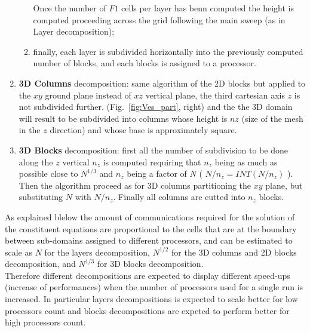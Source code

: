 \begin{enumerate}
\begin{enumerate}
Once the number of $F1$ cells per layer has benn computed the height is computed 
proceeding across the grid following the main sweep (as in Layer decomposition);
\item finally, each layer is subdivided horizontally into the previously computed number
of blocks, and each blocks is assigned to a processor. 
\end{enumerate}
\item {\bf 3D Columns } decomposition: same algorithm of the 2D blocks but applied to the $xy$ 
ground plane instead of $xz$ vertical plane, the third cartesian axis $z$ is not subdivided
further. (Fig.~\ref{fig:Ves_part}, right) and the the 3D domain will result to be subdivided
into columns whose height is $nz$ (size of the mesh in the $z$ direction) and whose base
is approximately square.
\item {\bf 3D Blocks} decomposition: first all the number of subdivision to be done
along the $z$ vertical $n_z$ is computed requiring that $n_z$ being as much as possible
close to $N^{1/3}$ and $n_z$ being a factor of $N$ ( $N/n_z = INT(N/n_z)$ ).
Then the algorithm proceed as for 3D columns partitioning the $xy$ plane, 
but substituting $N$ with $N/n_z$. Finally all columns are cutted into $n_z$ blocks.
\end{enumerate}

As explained blelow the amount of communications required for the solution 
of the constituent equations
are proportional to the cells that are at the boundary between sub-domains assigned to
different processors, and can be estimated to scale as $N$ for the layers decomposition, 
$N^{1/2}$ for the 3D columns
and 2D blocks decomposition, and $N^{1/3}$ for 3D blocks decomposition.\\
Therefore different decompositions are expected to display different speed-ups
(increase of performances) when the number of processors used for a single run
is increased. In particular layers decompositions is expected to scale better
for low processors count and blocks decompositions are expeted to perform 
better for high processors count.

